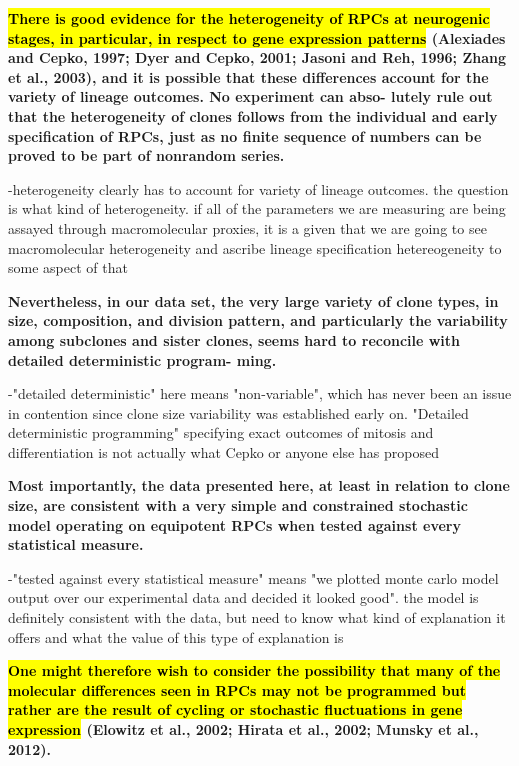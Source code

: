 \documentclass{ut-thesis}
\begin{document}
\bigskip

\textbf{\hl{
There is good evidence for the
heterogeneity of RPCs at neurogenic stages, in particular, in
respect to gene expression patterns} (Alexiades and Cepko,
1997; Dyer and Cepko, 2001; Jasoni and Reh, 1996; Zhang
et al., 2003), and it is possible that these differences account
for the variety of lineage outcomes. No experiment can abso-
lutely rule out that the heterogeneity of clones follows from the
individual and early specification of RPCs, just as no finite
sequence of numbers can be proved to be part of nonrandom
series.}

\bigskip

-heterogeneity clearly has to account for variety of lineage outcomes. the question is what kind of heterogeneity. if all of the parameters we are measuring are being assayed through macromolecular proxies, it is a given that we are going to see macromolecular heterogeneity and ascribe lineage specification hetereogeneity to some aspect of that

\bigskip

\textbf{ Nevertheless, in our data set, the very large variety of
clone types, in size, composition, and division pattern, and
particularly the variability among subclones and sister clones,
seems hard to reconcile with detailed deterministic program-
ming.}

\bigskip

-"detailed deterministic" here means "non-variable", which has never been an issue in contention since clone size variability was established early on. "Detailed deterministic programming" specifying exact outcomes of mitosis and differentiation is not actually what Cepko or anyone else has proposed

\bigskip

 \textbf{Most importantly, the data presented here, at least in
relation to clone size, are consistent with a very simple and
constrained stochastic model operating on equipotent RPCs
when tested against every statistical measure.}

\bigskip

-"tested against every statistical measure" means "we plotted monte carlo model output over our experimental data and decided it looked good". the model is definitely consistent with the data, but need to know what kind of explanation it offers and what the value of this type of explanation is

\bigskip

\textbf{\hl{
 One might
therefore wish to consider the possibility that many of the
molecular differences seen in RPCs may not be programmed
but rather are the result of cycling or stochastic fluctuations in
gene expression }(Elowitz et al., 2002; Hirata et al., 2002; Munsky
et al., 2012).}
\end{document}
